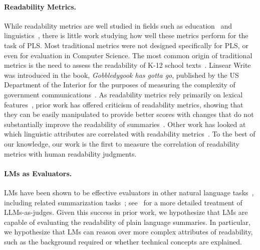 \paragraph{Readability Metrics.} While readability metrics are well studied in fields such as education~\cite{gray1935makes, dubay2004principles, texts_2022} and linguistics~\cite{Pires02102017}, there is little work studying how well these metrics perform for the task of PLS. 
Most traditional metrics were not designed specifically for PLS, or even for evaluation in Computer Science. The most common origin of traditional metrics is the need to assess the readability of K-12 school texts~\cite{dale1948formula, Coleman1975ACR}. %
Linsear Write was introduced in the book, \textit{Gobbledygook has gotta go}, published by the US Department of the Interior for the purposes of measuring the complexity of government communications~\cite{o1966gobbledygook}.
As readability metrics rely primarily on lexical features~\cite{508dd5a7-e076-39ee-bf49-06f80e20c28d}, prior work has offered criticism of readability metrics, showing that they can be easily manipulated to provide better scores with changes that do not substantially improve the readability of summaries~\cite{Tanprasert2021FleschKincaidIN}. Other work has looked at which linguistic attributes are correlated with readability metrics~\cite{tajner2012WhatCR}. To the best of our knowledge, our work is the first to measure the correlation of readability metrics with human readability judgments.

\paragraph{LMs as Evaluators.} LMs have been shown to be effective evaluators in other natural language tasks~\cite{li-etal-2025-exploring-reliability,10.1145/3640457.3688075,nedelchev-etal-2020-language}, including related summarization tasks~\cite{song-etal-2024-finesure}; see~ for a more detailed treatment of LLMs-as-judges. Given this success in prior work, we hypothesize that LMs are capable of evaluating the readability of plain language summaries. In particular, we hypothesize that LMs can reason over more complex attributes of readability, such as the background required or whether technical concepts are explained. 
